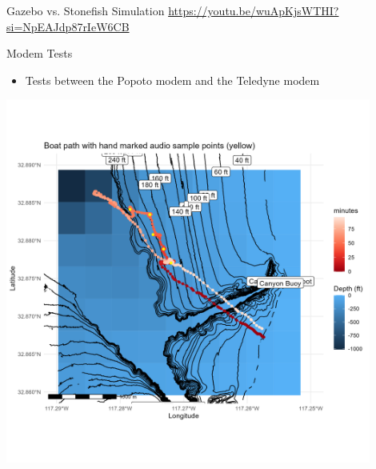 \begin{frame}{Gazebo vs. Stonefish Simulation}
    \href{https://youtu.be/wuApKjsWTHI?si=NpEAJdp87rIeW6CB}{https://youtu.be/wuApKjsWTHI?si=NpEAJdp87rIeW6CB}
\end{frame}

\begin{frame}{Modem Tests}
     \begin{itemize}
         \item Tests between the Popoto modem and the Teledyne modem
     \end{itemize}    
     \centering
     \includegraphics[height=0.9\textheight,width=0.9\textwidth,keepaspectratio]{images/VOLT/path_test_high_res.png}
 \end{frame}



